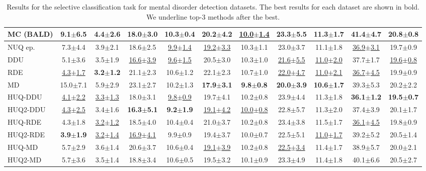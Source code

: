 \begin{table*}[!ht]
{\begin{tabular}{l|c|c|c|c|c|c|c|c|c|c}
MC (BALD) & 9.1$\pm$6.5 & 4.4$\pm$2.6 & 18.0$\pm$3.0 & 10.3$\pm$0.4 & 20.2$\pm$4.2 & \underline{10.0$\pm$1.4} & 23.3$\pm$5.5 & 11.3$\pm$1.7 & 41.4$\pm$4.7 & 20.8$\pm$0.8 \\ \midrule
NUQ ep. & 7.3$\pm$4.4 & 3.9$\pm$2.1 & 18.6$\pm$2.5 & \underline{9.9$\pm$1.4} & \underline{19.2$\pm$3.3} & 10.3$\pm$1.1 & 23.0$\pm$3.7 & 11.1$\pm$1.8 & \underline{36.9$\pm$3.1} & 19.7$\pm$0.9 \\
DDU & 5.1$\pm$3.6 & 3.5$\pm$1.9 & \underline{16.6$\pm$3.9} & \underline{9.6$\pm$1.5} & 20.5$\pm$3.0 & 10.3$\pm$1.0 & \underline{21.6$\pm$5.5} & \underline{11.0$\pm$2.0} & 37.7$\pm$1.7 & \underline{19.6$\pm$0.8} \\
RDE & \underline{4.3$\pm$1.7} & \textbf{3.2$\pm$1.2} & 21.1$\pm$2.3 & 10.6$\pm$1.2 & 22.1$\pm$2.3 & 10.7$\pm$1.0 & \underline{22.0$\pm$4.7} & \underline{11.0$\pm$2.1} & \underline{36.7$\pm$4.5} & 19.9$\pm$0.9 \\
MD & 15.0$\pm$7.1 & 5.9$\pm$2.9 & 23.1$\pm$2.7 & 10.2$\pm$1.3 & \textbf{17.9$\pm$3.1} & \textbf{9.8$\pm$0.8} & \textbf{20.0$\pm$3.9} & \textbf{10.6$\pm$1.7} & 39.3$\pm$5.3 & 20.2$\pm$2.2 \\ \midrule
HUQ-DDU & \underline{4.1$\pm$2.2} & \underline{3.3$\pm$1.3} & 18.0$\pm$3.1 & \underline{9.8$\pm$0.9} & 19.7$\pm$4.1 & 10.2$\pm$0.8 & 23.9$\pm$4.4 & 11.3$\pm$1.8 & \textbf{36.1$\pm$1.2} & \textbf{19.5$\pm$0.7} \\
HUQ2-DDU & \underline{4.3$\pm$2.5} & 3.4$\pm$1.6 & \textbf{16.3$\pm$5.1} & \textbf{9.2$\pm$1.9} & \underline{19.1$\pm$4.2} & \underline{10.0$\pm$0.8} & 22.8$\pm$5.7 & 11.3$\pm$2.0 & 37.4$\pm$3.9 & 20.1$\pm$1.7 \\
HUQ-RDE & 4.3$\pm$1.8 & \underline{3.2$\pm$1.2} & 18.5$\pm$4.0 & 10.4$\pm$0.4 & 21.0$\pm$3.7 & 10.2$\pm$0.8 & 23.4$\pm$3.8 & 11.5$\pm$1.7 & \underline{36.1$\pm$4.5} & 19.8$\pm$0.9 \\
HUQ2-RDE & \textbf{3.9$\pm$1.9} & \underline{3.2$\pm$1.4} & \underline{16.9$\pm$4.1} & 9.9$\pm$0.9 & 19.4$\pm$3.7 & 10.0$\pm$0.7 & 22.5$\pm$5.1 & \underline{11.0$\pm$1.7} & 39.2$\pm$5.2 & 20.5$\pm$1.4 \\
HUQ-MD & 5.7$\pm$2.9 & 3.6$\pm$1.4 & 20.6$\pm$3.7 & 10.6$\pm$0.4 & \underline{19.1$\pm$3.9} & 10.2$\pm$0.8 & \underline{22.5$\pm$3.4} & 11.4$\pm$1.7 & 38.9$\pm$5.7 & 20.0$\pm$2.1 \\
HUQ2-MD & 5.7$\pm$3.6 & 3.5$\pm$1.4 & 18.8$\pm$3.4 & 10.6$\pm$0.5 & 19.5$\pm$3.2 & 10.1$\pm$0.9 & 23.3$\pm$4.9 & 11.4$\pm$1.8 & 40.1$\pm$6.6 & 20.5$\pm$2.7 \\
\bottomrule
\end{tabular}
}\caption{\label{tab:psy_ue_rubioroberta}Results for the selective classification task for mental disorder detection datasets. The best results for each dataset are shown in bold. We underline top-3 methods after the best.}
\end{table*}
